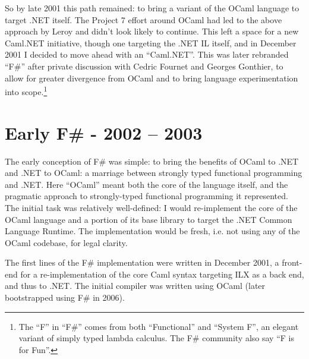 \documentclass[acmsmall,review]{acmart}\settopmatter{printfolios=true,printccs=false,printacmref=false}
\begin{document}
So by late 2001 this path remained: to bring a variant of the OCaml language to target .NET itself. The Project 7 effort around OCaml had led to the above approach by Leroy and didn’t look likely to continue.  This left a space for a new Caml.NET initiative, though one targeting the .NET IL itself, and in December 2001 I decided to move ahead with an “Caml.NET”. This was later rebranded “F\#” after private discussion with Cedric Fournet and Georges Gonthier, to allow for greater divergence from OCaml and to bring language experimentation into scope.\footnote{The “F” in “F\#” comes from both “Functional” and “System F”, an elegant variant of simply typed lambda calculus. The F\# community also say “F is for Fun”.}


\section*{Early F\# - 2002 – 2003}

The early conception of F\# was simple: to bring the benefits of OCaml to .NET and .NET to OCaml: a marriage between strongly typed functional programming and .NET.  Here “OCaml” meant both the core of the language itself, and the pragmatic approach to strongly-typed functional programming it represented. The initial task was relatively well-defined: I would re-implement the core of the OCaml language and a portion of its base library to target the .NET Common Language Runtime. The implementation would be fresh, i.e. not using any of the OCaml codebase, for legal clarity. 

The first lines of the F\# implementation were written in December 2001, a front-end for a re-implementation of the core Caml syntax targeting ILX as a back end, and thus to .NET. The initial compiler was written using OCaml (later bootstrapped using F\# in 2006). 
\end{document}
